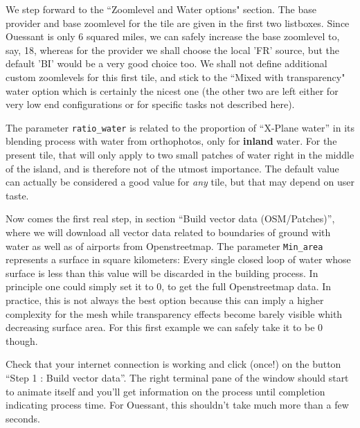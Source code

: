 \documentclass[12pt]{article}
\begin{document}
\medskip

We step forward to the ``Zoomlevel and Water options" section. The base provider and base zoomlevel for the tile are given in the first two listboxes. Since Ouessant is only 6 squared miles, we can safely increase the base zoomlevel to, say, 18, whereas for the provider we shall choose the local 'FR' source, but the default 'BI' would be a very good choice too. We shall not define additional custom zoomlevels for this first tile, and stick to the ``Mixed with transparency" water option which is certainly the nicest one (the other two are left either for very low end configurations or for specific tasks not described here).

The parameter {\tt ratio\_water} is related to the proportion of ``X-Plane water'' in its blending process with water from orthophotos, only for {\bf inland} water. For the present tile, that will only apply to two small patches of water right in the middle of the island, and is therefore not of the utmost importance. The default value can actually be considered a good value for {\it any} tile, but that may depend on user taste.

\medskip

Now comes the first real step, in section ``Build vector data (OSM/Patches)'', where we will download all vector data related to boundaries of ground with water as well as of airports from Openstreetmap.
The parameter {\tt Min\_area} represents a surface in square kilometers: Every single closed loop of water whose surface is less than this value will be discarded in the building process. In principle one could simply set it to $0$, to get the full Openstreetmap data. In practice, this is not always the best option because this can imply a higher complexity for the mesh while transparency effects become barely visible whith decreasing surface area. For this first example we can safely take it to be $0$ though.

Check that your internet connection is working and click (once!) on the button ``Step 1 : Build vector data''.
The right terminal pane of the window should start to animate itself and you'll get information on the process until completion indicating process time. For Ouessant, this shouldn't take much more than a few seconds.

\medskip
\end{document}
